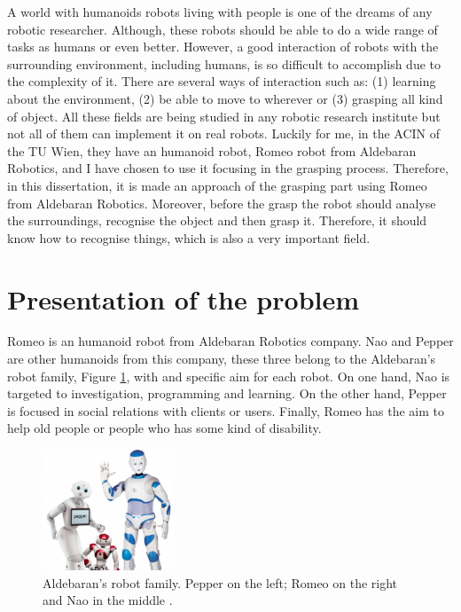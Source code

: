 \documentclass[12pt,a4paper,final,twoside,openright]{report}
\begin{document}
A world with humanoids robots living with people is one of the dreams of any robotic researcher. Although, these robots should be able to do a wide range of tasks as humans or even better. However, a good interaction of robots with the surrounding environment, including humans, is so difficult to accomplish due to the complexity of it. There are several ways of interaction such as: (1) learning about the environment, (2) be able to move to wherever or (3) grasping all kind of object. All these fields are being studied in any robotic research institute but not all of them can implement it on real robots. Luckily for me, in the ACIN of the TU Wien, they have an humanoid robot, Romeo robot from Aldebaran Robotics, and I have chosen to use it focusing in the grasping process. Therefore, in this dissertation, it is made an approach of the grasping part using Romeo from Aldebaran Robotics. Moreover, before the grasp the robot should analyse the surroundings, recognise the object and then grasp it. Therefore, it should know how to recognise things, which is also a very important field.  


\section{Presentation of the problem}

Romeo is an humanoid robot from Aldebaran Robotics company. Nao and Pepper are other humanoids from this company, these three belong to the Aldebaran's robot family, Figure \ref{fig:aldebaran_family}, with and specific aim for each robot. On one hand, Nao is targeted to investigation, programming and learning. On the other hand, Pepper is focused in social relations with clients or users. Finally, Romeo has the aim to help old people or people who has some kind of disability.	

\begin{figure}
	    \centering
		\includegraphics[width=0.35\textwidth]{images/romeo_nao_pepper.jpg}
         \caption{Aldebaran's robot family. Pepper on the left; Romeo on the right and Nao in the middle \cite{ParPaul}. \label{fig:aldebaran_family}}
\end{figure}
\end{document}
